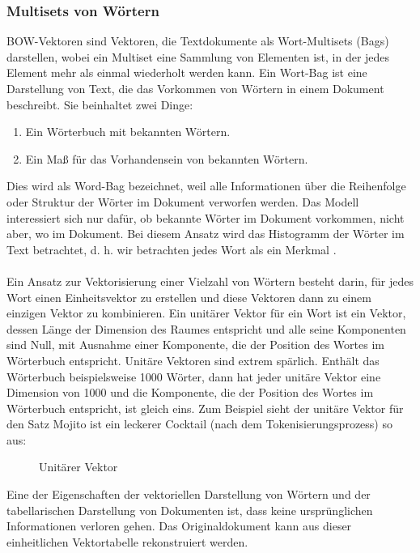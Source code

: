 \subsubsection{Multisets von Wörtern}
\ac{BOW}-Vektoren sind Vektoren, die Textdokumente als Wort-Multisets (Bags) darstellen, wobei ein Multiset eine Sammlung von Elementen ist, in der jedes Element mehr als einmal wiederholt werden kann. 
Ein Wort-Bag ist eine Darstellung von Text, die das Vorkommen von Wörtern in einem Dokument beschreibt. 
Sie beinhaltet zwei Dinge:
\begin{enumerate}
    \item Ein Wörterbuch mit bekannten Wörtern.
    \item Ein Maß für das Vorhandensein von bekannten Wörtern.
\end{enumerate}
Dies wird als \glqq{}Word-Bag\grqq{} bezeichnet, weil alle Informationen über die Reihenfolge oder Struktur der Wörter im Dokument verworfen werden. 
Das Modell interessiert sich nur dafür, ob bekannte Wörter im Dokument vorkommen, nicht aber, wo im Dokument. 
Bei diesem Ansatz wird das Histogramm der Wörter im Text betrachtet, d. h. wir betrachten jedes Wort als ein Merkmal \cite{goldberg_neural_2017}.\\\\
Ein Ansatz zur Vektorisierung einer Vielzahl von Wörtern besteht darin, für jedes Wort einen Einheitsvektor zu erstellen und diese Vektoren dann zu einem einzigen Vektor zu kombinieren. 
Ein unitärer Vektor für ein Wort ist ein Vektor, dessen Länge der Dimension des Raumes entspricht und alle seine Komponenten sind Null, mit Ausnahme einer Komponente, die der Position des Wortes im Wörterbuch entspricht. Unitäre Vektoren sind extrem spärlich. 
Enthält das Wörterbuch beispielsweise 1000 Wörter, dann hat jeder unitäre Vektor eine Dimension von 1000 und die Komponente, die der Position des Wortes im Wörterbuch entspricht, ist gleich eins.
Zum Beispiel sieht der unitäre Vektor für den Satz \glqq Mojito ist ein leckerer Cocktail\grqq{} (nach dem Tokenisierungsprozess) so aus:
\begin{figure}[H]
    \centering
    \caption{\label{figure:Unitaere_Vektoe}Unitärer Vektor}
\end{figure}
\noindent
Eine der Eigenschaften der vektoriellen Darstellung von Wörtern und der tabellarischen Darstellung von Dokumenten ist, dass keine ursprünglichen Informationen verloren gehen. 
Das Originaldokument kann aus dieser einheitlichen Vektortabelle rekonstruiert werden. 
